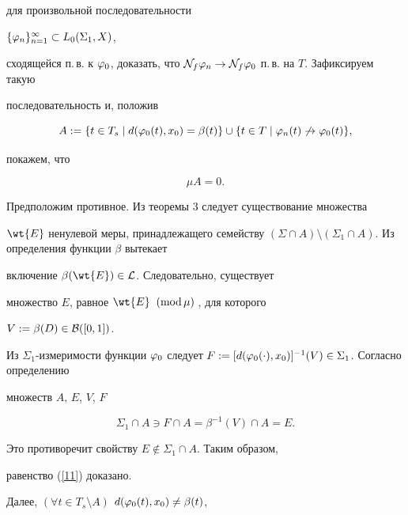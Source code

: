 для произвольной последовательности


$\{\varphi_n\}_{n=1}^\infty\subset L_0(\Sigma_1,X)$,


сходящейся п.\,в. к $\f_0$, доказать, что ${\cal N}_f\f_n\to


{\cal N}_f\f_0$ п.\,в. на $T$. Зафиксируем такую


последовательность и, положив


$$


A:=\{t\in T_s\mid d(\f_0(t),x_0)=\beta(t)\}\cup


\{t\in T\mid \f_n(t)\not\to\f_0(t)\},


$$


покажем, что


\begin{equation}


\label{11}


\mu A=0.


\end{equation}





Предположим противное. Из теоремы 3 следует существование множества


$\wt{E}$ ненулевой меры, принадлежащего семейству $(\Sigma\cap


A)\setminus (\Sigma_1\cap A)$. Из определения функции $\beta$ вытекает


включение $\beta(\wt{E})\in{\cal L}$. Следовательно, существует


множество $E$, равное $\wt{E}\;\moddd$, для которого


$V:=\beta(D)\in{\cal B}([0,1])$.





Из $\Sigma_1$-из\-ме\-ри\-мос\-ти функции $\f_0$ следует $F:=


[d(\f_0(\cdot),x_0)]^{-1}(V)\in\Sigma_1$. Согласно определению


множеств $A$, $E$, $V$, $F$


$$


\Sigma_1\cap A\ni F\cap A=\beta^{-1}(V)\cap A=E.


$$


Это противоречит свойству $E\notin\Sigma_1\cap A$. Таким образом,


равенство (\ref{11}) доказано.





Далее, $(\forall t\in T_s\setminus A)$\; $d(\varphi_0(t),x_0)\ne\beta(t)$,


